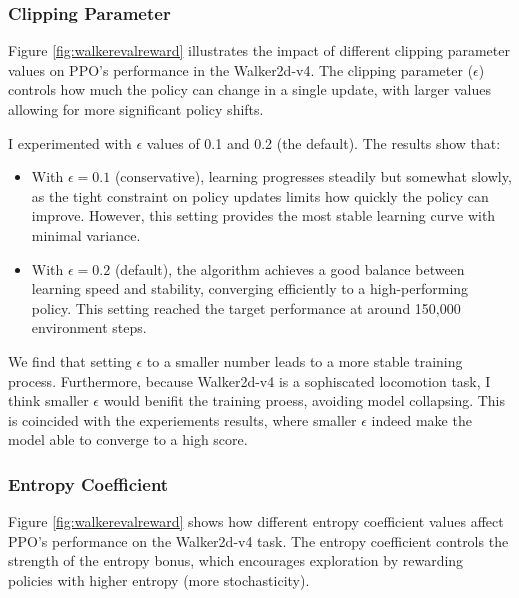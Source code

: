 \documentclass[a4paper,twocolumn]{article}
\begin{document}
\subsubsection{Clipping Parameter}


Figure \ref{fig:walkerevalreward} illustrates the impact of different clipping parameter values on PPO's performance in the Walker2d-v4. The clipping parameter ($\epsilon$) controls how much the policy can change in a single update, with larger values allowing for more significant policy shifts.

I experimented with $\epsilon$ values of 0.1 and 0.2 (the default). The results show that:

\begin{itemize}
    \item With $\epsilon = 0.1$ (conservative), learning progresses steadily but somewhat slowly, as the tight constraint on policy updates limits how quickly the policy can improve. However, this setting provides the most stable learning curve with minimal variance.
    
    \item With $\epsilon = 0.2$ (default), the algorithm achieves a good balance between learning speed and stability, converging efficiently to a high-performing policy. This setting reached the target performance at around 150,000 environment steps.
    
\end{itemize}

We find that setting $\epsilon$ to a smaller number leads to a more stable training process. Furthermore, because Walker2d-v4 is a sophiscated locomotion task, I think smaller $\epsilon$ would benifit the training proess, avoiding model collapsing. This is coincided with the experiements results, where smaller $\epsilon$ indeed make the model able to converge to a high score.

\subsubsection{Entropy Coefficient}

Figure \ref{fig:walkerevalreward} shows how different entropy coefficient values affect PPO's performance on the Walker2d-v4 task. The entropy coefficient controls the strength of the entropy bonus, which encourages exploration by rewarding policies with higher entropy (more stochasticity).
\end{document}

